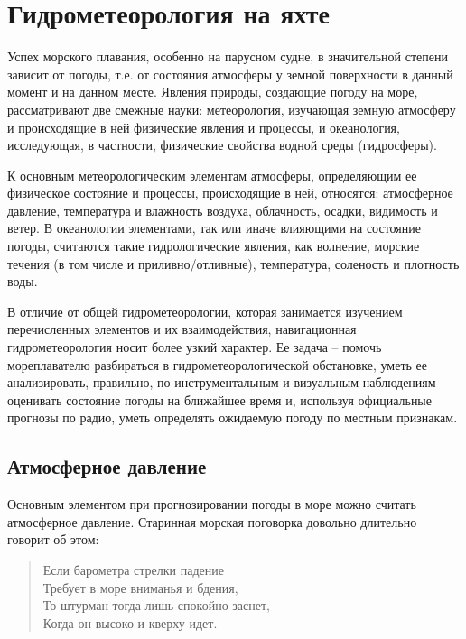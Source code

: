 \documentclass[a4paper, 12pt, twoside, final, book, russian, fittopage, cyremdash]{ncc}
\begin{document}
\chapter{Гидрометеорология на яхте}

Успех морского плавания, особенно на парусном судне, в значительной степени зависит от погоды, т.е. от состояния атмосферы у земной поверхности в данный момент и на данном месте. Явления природы, создающие погоду на море, рассматривают две смежные науки: метеорология, изучающая земную атмосферу и происходящие в ней физические явления и процессы, и океанология, исследующая, в частности, физические свойства водной среды (гидросферы).

К основным метеорологическим элементам атмосферы, определяющим ее физическое состояние и процессы, происходящие в ней, относятся: атмосферное давление, температура и влажность воздуха, облачность, осадки, видимость и ветер. В океанологии элементами, так или иначе влияющими на состояние погоды, считаются такие гидрологические явления, как волнение, морские течения (в том числе и приливно\-/отливные), температура, соленость и плотность воды.

В отличие от общей гидрометеорологии, которая занимается изучением перечисленных элементов и их взаимодействия, навигационная гидрометеорология носит более узкий характер. Ее задача \--- помочь мореплавателю разбираться в гидрометеорологической обстановке, уметь ее анализировать, правильно, по инструментальным и визуальным наблюдениям оценивать состояние погоды на ближайшее время и, используя официальные прогнозы по радио, уметь определять ожидаемую погоду по местным признакам.

\section{Атмосферное давление}

Основным элементом при прогнозировании погоды в море можно считать атмосферное давление. Старинная морская поговорка довольно длительно говорит об этом:

\begin{quote}
Если барометра стрелки падение \\
Требует в море вниманья и бдения, \\
То штурман тогда лишь спокойно заснет, \\
Когда он высоко и кверху идет. \\
\end{quote}
\end{document}
